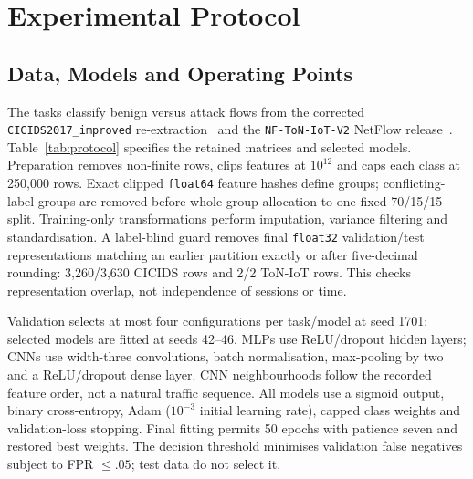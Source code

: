 \section{Experimental Protocol}
\label{sec:protocol}

\subsection{Data, Models and Operating Points}

The tasks classify benign versus attack flows from the corrected
\texttt{CICIDS2017\_improved} re-extraction~\cite{engelen2021troubleshooting,liu2022error}
and the \texttt{NF-ToN-IoT-V2} NetFlow release~\cite{sarhan2022towards}.
Table~\ref{tab:protocol} specifies the retained matrices and selected models.
Preparation removes non-finite rows, clips features at $10^{12}$ and caps each
class at 250,000 rows. Exact clipped \texttt{float64} feature hashes define
groups; conflicting-label groups are removed before whole-group allocation to
one fixed 70/15/15 split. Training-only transformations perform imputation,
variance filtering and standardisation. A label-blind guard removes final
\texttt{float32} validation/test representations matching an earlier partition
exactly or after five-decimal rounding: 3,260/3,630 CICIDS rows and 2/2 ToN-IoT
rows. This checks representation overlap, not independence of sessions or time.

Validation selects at most four configurations per task/model at seed 1701;
selected models are fitted at seeds 42--46. MLPs use ReLU/dropout hidden layers;
CNNs use width-three convolutions, batch normalisation, max-pooling by two
and a ReLU/dropout dense layer. CNN neighbourhoods follow the recorded feature
order, not a natural traffic sequence. All models use a sigmoid output,
binary cross-entropy, Adam ($10^{-3}$ initial learning rate), capped class
weights and validation-loss stopping. Final fitting permits 50 epochs with
patience seven and restored best weights. The decision threshold minimises
validation false negatives subject to FPR $\leq .05$; test data do not select it.


\begin{table}[t]
\centering\small
\caption{RQ1, conditional similarities with 95\% intervals and metric-specific
coverage $C$ (\%). $N$: available source--seed records; $S$: distinct sources.
R = stochastic recomputation; Q = quadrature sensitivity; D = deterministic
control. LIME averages 1,225 dependent run pairs per record, not 1,225
independent observations. SHAP intervals condition on two runs.}
\label{tab:repeatability}
\setlength{\tabcolsep}{3pt}

\end{table}

